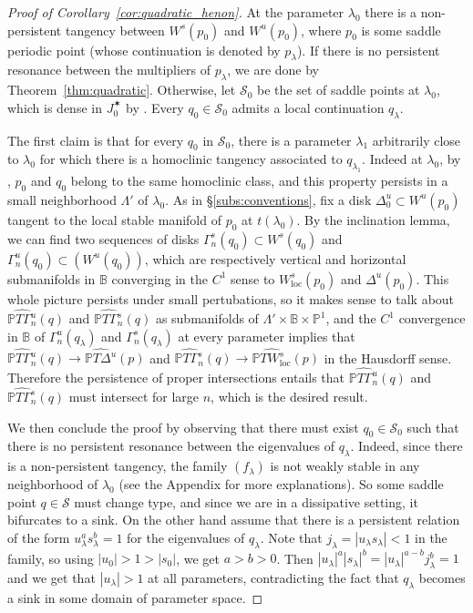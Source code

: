 \documentclass[11pt, oneside]{amsart}
\newcommand{\B}{\mathbb{B}}
\renewcommand{\P}{\mathbb{P}}
\newcommand{\abs}[1]{\left\vert#1\right\vert}
\newcommand{\la}{\lambda}
\newcommand{\lo}{{\lambda_0}}
\newcommand{\loc}{{\mathrm{loc}}}
\theoremstyle{remark}
\theoremstyle{definition}
\theoremstyle{theorem}
\begin{document}
\begin{proof}[Proof of Corollary~\ref{cor:quadratic_henon}] 
At the parameter $\lo$ there is a non-persistent 
tangency between $W^s(p_0)$ and $W^u(p_0)$, where $p_0$ is 
some saddle periodic point (whose continuation is   denoted by $p_\la$). 
If there is no persistent resonance between the multipliers of $p_\la$, we are done by Theorem~\ref{thm:quadratic}. Otherwise, let 
$\mathcal S_0$ be the set of saddle points at $\lo$, which is dense in 
$J^\varstar_0$ by \cite{bls}. Every $q_0\in \mathcal S_0$ admits a local continuation $q_\lambda$.

The first claim is that for every $q_0$ in $\mathcal S_0$, there is a parameter $\la_1$ arbitrarily close to $\lo$ for  which there is a homoclinic tangency associated to $q_{\lambda_1}$. 
Indeed at $\lambda_0$, by \cite[Thm 9.6]{bls}, 
$p_0$ and $q_0$ belong to the same homoclinic class, and this property persists in a small neighborhood $\Lambda'$ of $\lo$. As in \S\ref{subs:conventions}, fix a disk 
$\Delta^u_0 \subset W^u(p_0)$ tangent to the local stable manifold of $p_0$ at $t(\lo)$. By the inclination lemma, we can find two  sequences of disks $\Gamma_n^s(q_0)\subset W^s(q_0)$ and 
$\Gamma^u_n(q_0)\subset (W^u(q_0))$, which are 
respectively vertical and horizontal submanifolds in $\B$
converging in the $C^1$ sense 
to  $W^s_\loc (p_0)$ and $\Delta^u(p_0)$. This whole picture persists  under small pertubations, 
so it makes sense to talk about $\widehat {\P T\Gamma^u_n}(q)$  and 
$\widehat {\P T\Gamma^s_n}(q)$
 as submanifolds of 
$\Lambda'\times \B\times \P^1$, and the $C^1$ convergence in $\B$ of $\Gamma^u_n(q_\la)$ and 
$\Gamma^s_n(q_\la)$ at every parameter implies that 
$\widehat {\P T\Gamma^u_n}(q) \to \widehat {\P T\Delta^u}(p)$ and 
$\widehat {\P T\Gamma^s_n}(q) \to \widehat {\P TW^s_\loc}(p)$ in the Hausdorff sense. Therefore 
the  persistence 
of proper intersections entails
 that $\widehat {\P T\Gamma^u_n}(q)$ and $\widehat {\P T\Gamma^s_n}(q)$ 
 must intersect for large $n$, which is the desired result. 

We then conclude the proof by observing that there  must exist $q_0\in \mathcal S_0$ such that 
there is no persistent resonance between the eigenvalues of $q_\la$. Indeed, since there is a non-persistent tangency, the family $(f_\la)$ is not  weakly stable 
 in any neighborhood of $\lo$ (see the Appendix for more explanations). 
 So some saddle point $q\in \mathcal S$ must change type, and since we are in a 
dissipative setting, it  bifurcates to a sink. On the other hand 
assume that  there is a persistent relation of the form $u_\la^as_\la^b =1$ for the eigenvalues of $q_\la$.
Note that $j_\la = \abs{u_\la s_\la}<1$ in the family, so using $\abs{u_0}> 1 > \abs{s_0}$, we get 
 $a>b>0$. Then $\abs{u_\la}^a \abs{s_\la}^b = \abs{u_\la}^{a-b} j_\la^b =1$ and we get that 
 $\abs{u_\la}>1$ at all parameters, contradicting the fact that $q_\la$ becomes   
 a sink in some domain of 
   parameter space. 
\end{proof}
\end{document}
